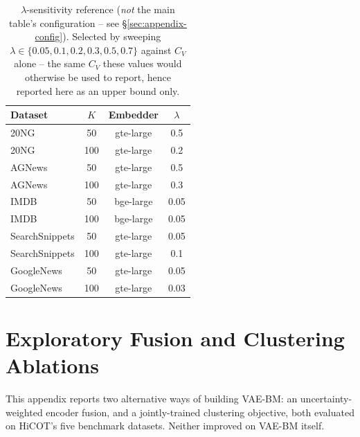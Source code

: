 \documentclass[11pt]{article}
\begin{document}
\begin{table}[h]
\centering
\small
\begin{tabular}{lccc}
\toprule
Dataset & $K$ & Embedder & $\lambda$ \\
\midrule
20NG & 50 & gte-large & 0.5 \\
20NG & 100 & gte-large & 0.2 \\
AGNews & 50 & gte-large & 0.5 \\
AGNews & 100 & gte-large & 0.3 \\
IMDB & 50 & bge-large & 0.05 \\
IMDB & 100 & bge-large & 0.05 \\
SearchSnippets & 50 & gte-large & 0.05 \\
SearchSnippets & 100 & gte-large & 0.1 \\
GoogleNews & 50 & gte-large & 0.05 \\
GoogleNews & 100 & gte-large & 0.03 \\
\bottomrule
\end{tabular}
\caption{$\lambda$-sensitivity reference (\emph{not} the main table's configuration -- see \S\ref{sec:appendix-config}). Selected by sweeping $\lambda\in\{0.05,0.1,0.2,0.3,0.5,0.7\}$ against $C_V$ alone -- the same $C_V$ these values would otherwise be used to report, hence reported here as an upper bound only.}
\label{tab:appendix-config}
\end{table}

\section{Exploratory Fusion and Clustering Ablations}
\label{sec:appendix-ablation}
This appendix reports two alternative ways of building VAE-BM: an uncertainty-weighted encoder fusion, and a jointly-trained clustering objective, both evaluated on HiCOT's five benchmark datasets. Neither improved on VAE-BM itself.
\end{document}
